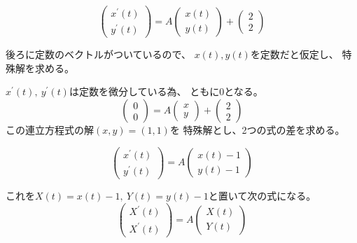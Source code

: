 \documentclass[12pt,b5paper]{ltjsarticle}
\begin{document}
\begin{equation}
 \begin{pmatrix} x^\prime(t) \\ y^\prime(t) \end{pmatrix}
 = A
  \begin{pmatrix} x(t) \\ y(t) \end{pmatrix}
  +
  \begin{pmatrix} 2 \\ 2 \end{pmatrix}
\end{equation}

後ろに定数のベクトルがついているので、
$x(t),y(t)$を定数だと仮定し、
特殊解を求める。

$x^\prime(t),\ y^\prime(t)$は定数を微分している為、
ともに0となる。
\begin{equation}
 \begin{pmatrix} 0 \\ 0 \end{pmatrix}
 = A
  \begin{pmatrix} x \\ y \end{pmatrix}
  +
  \begin{pmatrix} 2 \\ 2 \end{pmatrix}
\end{equation}
この連立方程式の解$(x,y)=(1,1)$を
特殊解とし、2つの式の差を求める。

\begin{equation}
 \begin{pmatrix} x^\prime(t) \\ y^\prime(t) \end{pmatrix}
 = A
  \begin{pmatrix} x(t)-1 \\ y(t)-1 \end{pmatrix}
\end{equation}

これを$X(t)=x(t)-1,\ Y(t)=y(t)-1$と置いて次の式になる。
\begin{equation}
 \begin{pmatrix} X^\prime(t) \\ X^\prime(t) \end{pmatrix}
 = A
  \begin{pmatrix} X(t) \\ Y(t) \end{pmatrix}
\end{equation}
\end{document}
